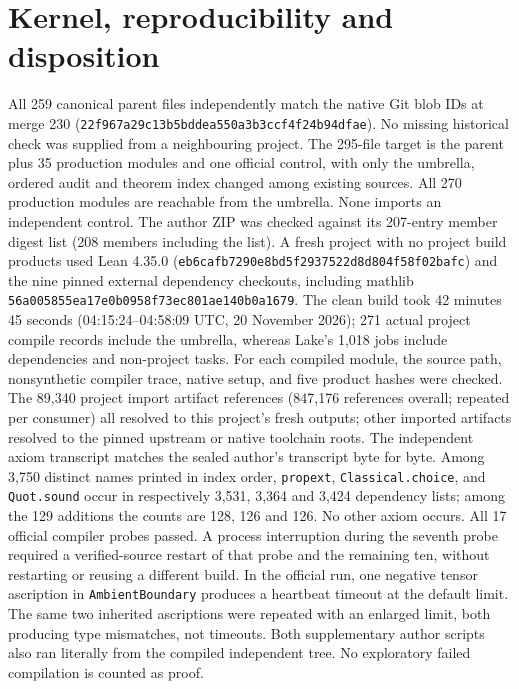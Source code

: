\documentclass[11pt]{article}
\newcommand{\nm}[1]{\nolinkurl{#1}}
\begin{document}
\section*{Kernel, reproducibility and disposition}
All 259 canonical parent files independently match the native Git blob IDs at merge 230 (\nm{22f967a29c13b5bddea550a3b3ccf4f24b94dfae}). No missing historical check was supplied from a neighbouring project. The 295-file target is the parent plus 35 production modules and one official control, with only the umbrella, ordered audit and theorem index changed among existing sources. All 270 production modules are reachable from the umbrella. None imports an independent control. The author ZIP was checked against its 207-entry member digest list (208 members including the list).
A fresh project with no project build products used Lean 4.35.0 (\nm{eb6cafb7290e8bd5f2937522d8d804f58f02bafc}) and the nine pinned external dependency checkouts, including mathlib \nm{56a005855ea17e0b0958f73ec801ae140b0a1679}. The clean build took 42 minutes 45 seconds (04:15:24--04:58:09 UTC, 20 November 2026); 271 actual project compile records include the umbrella, whereas Lake's 1,018 jobs include dependencies and non-project tasks. For each compiled module, the source path, nonsynthetic compiler trace, native setup, and five product hashes were checked. The 89,340 project import artifact references (847,176 references overall; repeated per consumer) all resolved to this project's fresh outputs; other imported artifacts resolved to the pinned upstream or native toolchain roots.
The independent axiom transcript matches the sealed author's transcript byte for byte. Among 3,750 distinct names printed in index order, \nm{propext}, \nm{Classical.choice}, and \nm{Quot.sound} occur in respectively 3,531, 3,364 and 3,424 dependency lists; among the 129 additions the counts are 128, 126 and 126. No other axiom occurs. All 17 official compiler probes passed. A process interruption during the seventh probe required a verified-source restart of that probe and the remaining ten, without restarting or reusing a different build. In the official run, one negative tensor ascription in \nm{AmbientBoundary} produces a heartbeat timeout at the default limit. The same two inherited ascriptions were repeated with an enlarged limit, both producing type mismatches, not timeouts. Both supplementary author scripts also ran literally from the compiled independent tree. No exploratory failed compilation is counted as proof.
\end{document}
